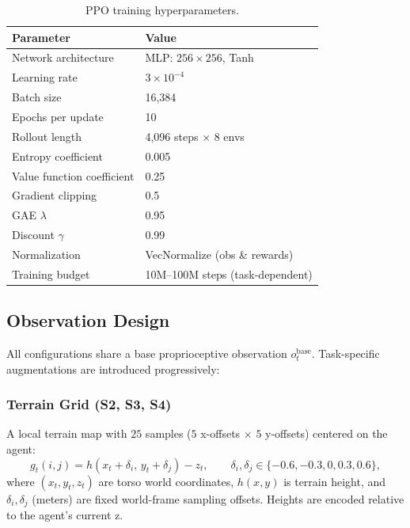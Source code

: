 \documentclass[conference]{IEEEtran}
\begin{document}
\begin{table}[h!]
\caption{PPO training hyperparameters.}
\label{tab:hyperparams}
\centering
\small
\begin{tabular}{@{}ll@{}}
\toprule
\textbf{Parameter} & \textbf{Value} \\
\midrule
Network architecture & MLP: $256 \times 256$, Tanh \\
Learning rate & $3 \times 10^{-4}$ \\
Batch size & 16{,}384 \\
Epochs per update & 10 \\
Rollout length & 4{,}096 steps $\times$ 8 envs \\
Entropy coefficient & 0.005 \\
Value function coefficient & 0.25 \\
Gradient clipping & 0.5 \\
GAE $\lambda$ & 0.95 \\
Discount $\gamma$ & 0.99 \\
Normalization & VecNormalize (obs \& rewards) \\
Training budget & 10M--100M steps (task-dependent) \\
\bottomrule
\end{tabular}
\end{table}


\subsection{Observation Design}
\label{sec:obs_design}

All configurations share a base proprioceptive observation $o_t^{\mathrm{base}}$. Task-specific augmentations are introduced progressively:

\subsubsection{Terrain Grid (S2, S3, S4)}

A local terrain map with $25$ samples ($5$ x-offsets $\times$ $5$ y-offsets) centered on the agent:
\begin{equation}
\label{eq:terrain_grid}
g_t(i,j) = h(x_t + \delta_i,\, y_t + \delta_j) - z_t, \qquad \delta_i, \delta_j \in \{-0.6, -0.3, 0, 0.3, 0.6\},
\end{equation}
where $(x_t,y_t,z_t)$ are torso world coordinates, $h(x,y)$ is terrain height, and $\delta_i,\delta_j$ (meters) are fixed world-frame sampling offsets. Heights are encoded relative to the agent’s current z.
\end{document}
